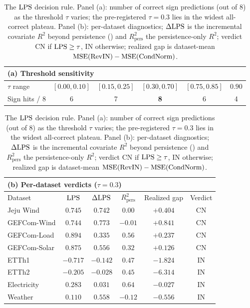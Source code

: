 \begin{table}[t]
\centering
\caption{The $\mathrm{LPS}$ decision rule. Panel (a): number of correct sign predictions (out of 8) as the threshold $\tau$ varies; the pre-registered $\tau=0.3$ lies in the widest all-correct plateau. Panel (b): per-dataset diagnostics; $\Delta\mathrm{LPS}$ is the incremental covariate $R^2$ beyond persistence () and $R^2_{\mathrm{pers}}$ the persistence-only $R^2$; verdict CN if $\mathrm{LPS}\ge\tau$, IN otherwise; realized gap is dataset-mean $\mathrm{MSE}(\text{RevIN})-\mathrm{MSE}(\text{CondNorm})$.}
\label{tab:tau}
\small
\begin{tabular}{lccccc}
\multicolumn{6}{l}{(a) Threshold sensitivity} \\
\toprule
$\tau$ range & $[0.00,0.10]$ & $[0.15,0.25]$ & $[0.30,0.70]$ & $[0.75,0.85]$ & $0.90$ \\
\midrule
Sign hits / 8 & 6 & 7 & \textbf{8} & 6 & 4 \\
\bottomrule
\end{tabular}

\vspace{1ex}

\begin{tabular}{lccccc}
\multicolumn{6}{l}{(b) Per-dataset verdicts ($\tau=0.3$)} \\
\toprule
Dataset & $\mathrm{LPS}$ & $\Delta\mathrm{LPS}$ & $R^2_{\mathrm{pers}}$ & Realized gap & Verdict \\
\midrule
Jeju Wind    & $0.745$  & $0.742$  & $0.00$  & $+0.404$ & CN \\
GEFCom-Wind  & $0.744$  & $0.773$  & $-0.01$ & $+0.841$ & CN \\
GEFCom-Load  & $0.894$  & $0.335$  & $0.56$  & $+0.237$ & CN \\
GEFCom-Solar & $0.875$  & $0.556$  & $0.32$  & $+0.126$ & CN \\
ETTh1        & $-0.717$ & $-0.142$ & $0.47$  & $-1.824$ & IN \\
ETTh2        & $-0.205$ & $-0.028$ & $0.45$  & $-6.314$ & IN \\
Electricity  & $0.283$  & $0.031$  & $0.64$  & $-0.027$ & IN \\
Weather      & $0.110$  & $0.558$  & $-0.12$ & $-0.556$ & IN \\
\bottomrule
\end{tabular}
\end{table}

